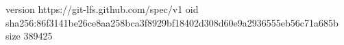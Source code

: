 version https://git-lfs.github.com/spec/v1
oid sha256:86f3141be26ce8aa258bca3f8929bf18402d308d60e9a2936555eb56c71a685b
size 389425
